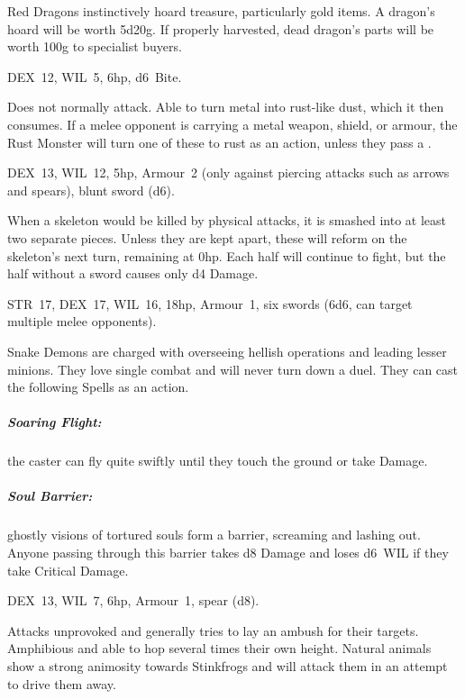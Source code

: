 \documentclass[itdr]{subfiles}
\begin{document}
Red Dragons instinctively hoard treasure, particularly gold items. A dragon's hoard will be worth 5d20g. If properly harvested, dead dragon's parts will be worth 100g to specialist buyers.

\vfill
\break

\vfill

DEX~12, WIL~5, 6hp, d6~Bite.

Does not normally attack. Able to turn metal into rust-like dust, which it then consumes. If a melee opponent is carrying a metal weapon, shield, or armour, the Rust Monster will turn one of these to rust as an action, unless they pass a .

\vfill

DEX~13, WIL~12, 5hp, Armour~2 (only against piercing attacks such as arrows and spears), blunt sword (d6).

When a skeleton would be killed by physical attacks, it is smashed into at least two separate pieces. Unless they are kept apart, these will reform on the skeleton's next turn, remaining at 0hp. Each half will continue to fight, but the half without a sword causes only d4 Damage.

\vfill


\vspace{-2ex}

STR~17, DEX~17, WIL~16, 18hp, Armour~1, six swords (6d6, can target multiple melee opponents).

Snake Demons are charged with overseeing hellish operations and leading lesser minions. They love single combat and will never turn down a duel. They can cast the following Spells as an action.

\vfill
\break

\subparagraph{Soaring Flight:} the caster can fly quite swiftly until they touch the ground or take Damage.

\subparagraph{Soul Barrier:} ghostly visions of tortured souls form a barrier, screaming and lashing out. Anyone passing through this barrier takes d8 Damage and loses d6~WIL if they take Critical Damage.

\vfill

DEX~13, WIL~7, 6hp, Armour~1, spear (d8).

Attacks unprovoked and generally tries to lay an ambush for their targets. Amphibious and able to hop several times their own height. Natural animals show a strong animosity towards Stinkfrogs and will attack them in an attempt to drive them away.
\end{document}
